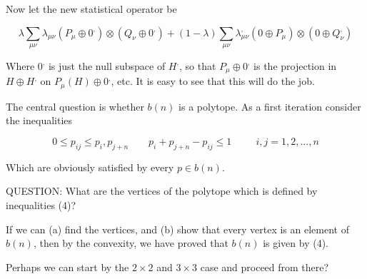 \documentclass{article}
\begin{document}
Now let the new statistical operator be

\begin{equation}
\lambda \sum_{\mu \nu }\lambda _{\mu \nu }(P_{\mu }\oplus 0^{,})\otimes
(Q_{\nu }\oplus 0^{,})+(1-\lambda )\sum_{\mu \nu }\lambda _{\mu \nu
}^{,}(0\oplus P_{\mu }^{,})\otimes (0\oplus Q_{\nu }^{,})  \tag{3}
\end{equation}

Where $0^{,}$ is just the null subspace of $H^{,}$, so that $P_{\mu }\oplus
0^{,}$ is the projection in $H\oplus H^{,}$ on $P_{\mu }(H)\oplus 0^{,}$,
etc. It is easy to see that this will do the job.

The central question is whether $b(n)$ is a polytope. As a first iteration
consider the inequalities

\begin{equation}
0\leq p_{ij}\leq p_{i},p_{j+n}\qquad p_{i}+p_{j+n}-p_{ij}\leq 1\ \qquad \
i,j=1,2,...,n  \tag{4}
\end{equation}

Which are obviously satisfied by every $p\in b(n)$.

QUESTION: What are the vertices of the polytope which is defined by
inequalities (4)?

If we can (a) find the vertices, and (b) show that every vertex is an
element of $b(n)$, then by the convexity, we have proved that $b(n)$ is
given by (4).

Perhaps we can start by the $2\times 2$ and $3\times 3$ case and proceed
from there?
\end{document}
